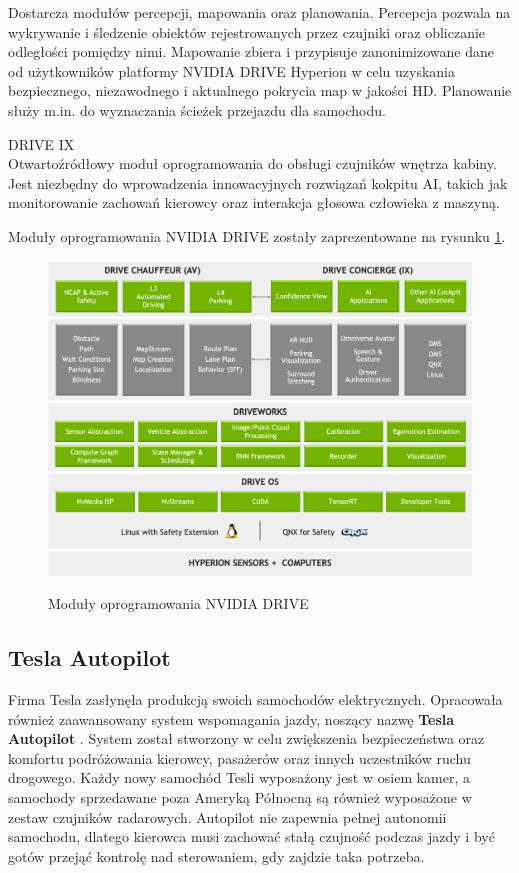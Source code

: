 \begin{enumerate*}
Dostarcza modułów percepcji, mapowania oraz planowania. Percepcja pozwala na wykrywanie i śledzenie obiektów rejestrowanych przez czujniki oraz obliczanie odległości pomiędzy nimi. Mapowanie zbiera i przypisuje zanonimizowane dane od użytkowników platformy NVIDIA DRIVE Hyperion w celu uzyskania bezpiecznego, niezawodnego i aktualnego pokrycia map w jakości HD. Planowanie służy m.in. do wyznaczania ścieżek przejazdu dla samochodu.
\item DRIVE IX \\
Otwartoźródłowy moduł oprogramowania do obsługi czujników wnętrza kabiny. Jest niezbędny do wprowadzenia innowacyjnych rozwiązań kokpitu AI, takich jak monitorowanie zachowań kierowcy oraz interakcja głosowa człowieka z maszyną.
\end{enumerate*}
Moduły oprogramowania NVIDIA DRIVE zostały zaprezentowane na rysunku \ref{NvidiaDriveSDK}.
\newpage
\begin{figure}[h]
\begin{center}
\includegraphics[width=15cm]{resources/figures/nv-drive-sdk.png}
\caption{Moduły oprogramowania NVIDIA DRIVE}
\label{NvidiaDriveSDK}
\end{center}
\end{figure}

\vspace{-0.5cm}
\subsection{Tesla Autopilot}
Firma Tesla zasłynęła produkcją swoich samochodów elektrycznych. Opracowała również zaawansowany system wspomagania jazdy, noszący nazwę \textbf{Tesla Autopilot} \cite{tesla:autopilotOverview}. System został stworzony w celu zwiększenia bezpieczeństwa oraz komfortu podróżowania kierowcy, pasażerów oraz innych uczestników ruchu drogowego. Każdy nowy samochód Tesli wyposażony jest w osiem kamer, a samochody sprzedawane poza Ameryką Północną są również wyposażone w zestaw czujników radarowych. Autopilot nie zapewnia pełnej autonomii samochodu, dlatego kierowca musi zachować stałą czujność podczas jazdy i być gotów przejąć kontrolę nad sterowaniem, gdy zajdzie taka potrzeba.

